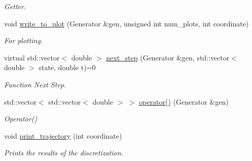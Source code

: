 \begin{DoxyCompactItemize}
\begin{DoxyCompactList}\small\item\em Getter. \end{DoxyCompactList}\item 
void \hyperlink{classprocess_a5fc8d61bdb3373b5f1a2b123bd8b2556}{write\+\_\+to\+\_\+plot} (Generator \&gen, unsigned int num\+\_\+plots, int coordinate)
\begin{DoxyCompactList}\small\item\em For plotting. \end{DoxyCompactList}\item 
virtual std\+::vector$<$ double $>$ \hyperlink{classprocess_a55c46e4b4ab1992ce09f4133fb484fd6}{next\+\_\+step} (Generator \&gen, std\+::vector$<$ double $>$ state, double t)=0
\begin{DoxyCompactList}\small\item\em Function Next Step. \end{DoxyCompactList}\item 
std\+::vector$<$ std\+::vector$<$ double $>$ $>$ \hyperlink{classprocess_ac728fbbd27c9e9d0b590e18e132480af}{operator()} (Generator \&gen)
\begin{DoxyCompactList}\small\item\em Operator() \end{DoxyCompactList}\item 
void \hyperlink{classprocess_ac74ffbcbb3f61ed3c9b17df1e844e4ee}{print\+\_\+trajectory} (int coordinate)\hypertarget{classprocess_ac74ffbcbb3f61ed3c9b17df1e844e4ee}{}\label{classprocess_ac74ffbcbb3f61ed3c9b17df1e844e4ee}

\begin{DoxyCompactList}\small\item\em Prints the results of the discretization. \end{DoxyCompactList}\end{DoxyCompactItemize}

